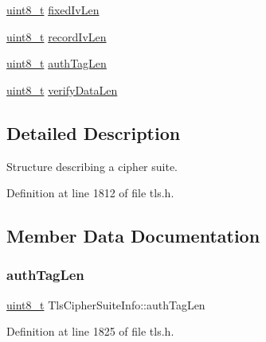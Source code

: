 \begin{DoxyCompactItemize}
\item 
\hyperlink{stdint_8h_aba7bc1797add20fe3efdf37ced1182c5}{uint8\+\_\+t} \hyperlink{structTlsCipherSuiteInfo_a2c6a2507984b67e38c6550630a20faef}{fixed\+Iv\+Len}
\item 
\hyperlink{stdint_8h_aba7bc1797add20fe3efdf37ced1182c5}{uint8\+\_\+t} \hyperlink{structTlsCipherSuiteInfo_a9be693ee50a842c085ca12cbe170cfcf}{record\+Iv\+Len}
\item 
\hyperlink{stdint_8h_aba7bc1797add20fe3efdf37ced1182c5}{uint8\+\_\+t} \hyperlink{structTlsCipherSuiteInfo_a133e585a8f9034be939c5b79f1243278}{auth\+Tag\+Len}
\item 
\hyperlink{stdint_8h_aba7bc1797add20fe3efdf37ced1182c5}{uint8\+\_\+t} \hyperlink{structTlsCipherSuiteInfo_a550f3617b1c48632d9613338edd22e7f}{verify\+Data\+Len}
\end{DoxyCompactItemize}


\subsection{Detailed Description}
Structure describing a cipher suite. 

Definition at line 1812 of file tls.\+h.



\subsection{Member Data Documentation}
\mbox{\label{structTlsCipherSuiteInfo_a133e585a8f9034be939c5b79f1243278}} 
\subsubsection{\texorpdfstring{auth\+Tag\+Len}{authTagLen}}
{\footnotesize\ttfamily \hyperlink{stdint_8h_aba7bc1797add20fe3efdf37ced1182c5}{uint8\+\_\+t} Tls\+Cipher\+Suite\+Info\+::auth\+Tag\+Len}



Definition at line 1825 of file tls.\+h.

\mbox{\label{structTlsCipherSuiteInfo_a98bbb77e510d4841cf2b25e337f93233}} 
